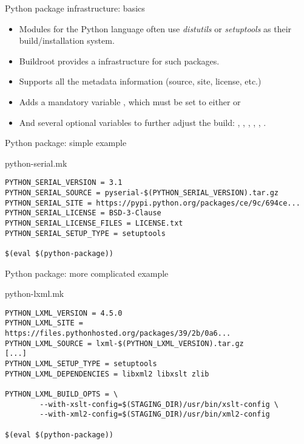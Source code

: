 \begin{frame}{Python package infrastructure: basics}
  \begin{itemize}
  \item Modules for the Python language often use {\em distutils} or
    {\em setuptools} as their build/installation system.
  \item Buildroot provides a  infrastructure for
    such packages.
  \item Supports all the  metadata information
    (source, site, license, etc.)
  \item Adds a mandatory variable , which must
    be set to either  or 
  \item And several optional variables to further adjust the build:
    , ,
    ,
    , ,
    .
  \end{itemize}
\end{frame}

\begin{frame}[fragile]{Python package: simple example}

  \begin{block}{python-serial.mk}
    \begin{verbatim}
PYTHON_SERIAL_VERSION = 3.1
PYTHON_SERIAL_SOURCE = pyserial-$(PYTHON_SERIAL_VERSION).tar.gz
PYTHON_SERIAL_SITE = https://pypi.python.org/packages/ce/9c/694ce...
PYTHON_SERIAL_LICENSE = BSD-3-Clause
PYTHON_SERIAL_LICENSE_FILES = LICENSE.txt
PYTHON_SERIAL_SETUP_TYPE = setuptools

$(eval $(python-package))
    \end{verbatim}
  \end{block}

\end{frame}

\begin{frame}[fragile]{Python package: more complicated example}
  \begin{block}{python-lxml.mk}
    \begin{verbatim}
PYTHON_LXML_VERSION = 4.5.0
PYTHON_LXML_SITE = https://files.pythonhosted.org/packages/39/2b/0a6...
PYTHON_LXML_SOURCE = lxml-$(PYTHON_LXML_VERSION).tar.gz
[...]
PYTHON_LXML_SETUP_TYPE = setuptools
PYTHON_LXML_DEPENDENCIES = libxml2 libxslt zlib

PYTHON_LXML_BUILD_OPTS = \
        --with-xslt-config=$(STAGING_DIR)/usr/bin/xslt-config \
        --with-xml2-config=$(STAGING_DIR)/usr/bin/xml2-config

$(eval $(python-package))
    \end{verbatim}
  \end{block}
\end{frame}

